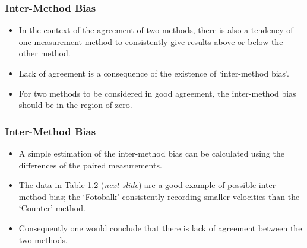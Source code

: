 \documentclass[compress]{beamer}        %
\begin{document}
\begin{frame}
\frametitle{Inter-Method Bias}
\large
\vspace{-1cm}
\begin{itemize}
\item 
In the context of the agreement of two methods, there is also a
tendency of one measurement method to consistently give results
above or below the other method. \item Lack of agreement is a
consequence of the existence of `inter-method bias'. 
\item For two
methods to be considered in good agreement, the inter-method bias
should be in the region of zero. 
\end{itemize}
\end{frame}
\begin{frame}
\frametitle{Inter-Method Bias}
\large
\begin{itemize}
\item 
A simple estimation of the
inter-method bias can be calculated using the differences of the
paired measurements. \item The data in Table 1.2 (\textit{next slide}) are a good example of
possible inter-method bias; the `Fotobalk' consistently recording
smaller velocities than the `Counter' method.
\item Consequently one
would conclude that there is lack of agreement between the two
methods.
\end{itemize}
\end{frame}
\end{document}
